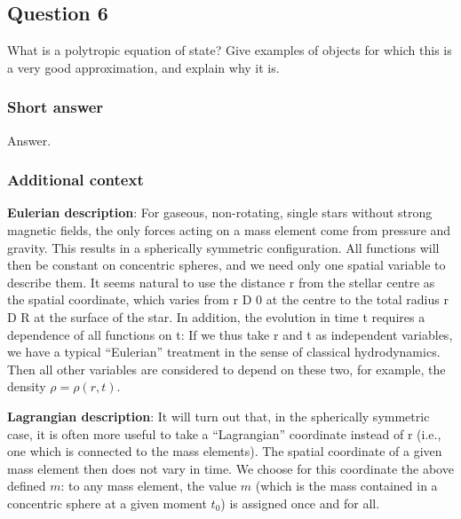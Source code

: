 \documentclass[a4paper,10pt]{article}
\begin{document}

\newpage
\subsection{Question 6}

What is a polytropic equation of state? Give examples of objects for which this is a very good approximation, and explain why it is.

\subsubsection{Short answer}

Answer.

\subsubsection{Additional context}

{\noindent}\textbf{Eulerian description}: For gaseous, non-rotating, single stars without strong magnetic fields, the only forces acting on a mass element come from pressure and gravity. This results in a spherically symmetric configuration. All functions will then be constant on concentric spheres, and we need only one spatial variable to describe them. It seems natural to use the distance r from the stellar centre as the spatial coordinate, which varies from r D 0 at the centre to the total radius r D R at the surface of the star. In addition, the evolution in time t requires a dependence of all functions on t: If we thus take r and t as independent variables, we have a typical ``Eulerian'' treatment in the sense of classical hydrodynamics. Then all other variables are considered to depend on these two, for example, the density $\rho=\rho(r,t)$.

{\noindent}\textbf{Lagrangian description}: It will turn out that, in the spherically symmetric case, it is often more useful to take a ``Lagrangian'' coordinate instead of r (i.e., one which is connected to the mass elements). The spatial coordinate of a given mass element then does not vary in time. We choose for this coordinate the above defined $m$: to any mass element, the value $m$ (which is the mass contained in a concentric sphere at a given moment $t_0$) is assigned once and for all.
\end{document}
